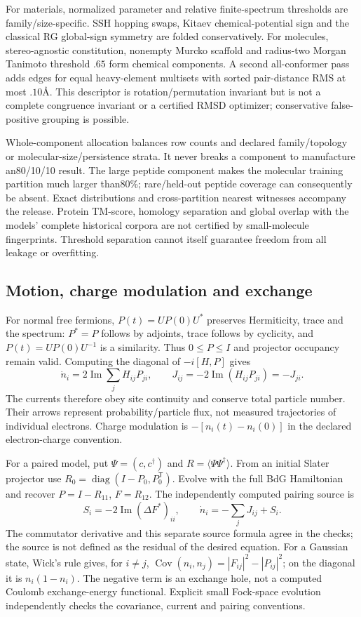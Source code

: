 \documentclass[11pt,oneside,openany]{book}
\theoremstyle{definition}\newtheorem{definition}[theorem]{Definition}
\theoremstyle{remark}\newtheorem{remark}[theorem]{Remark}
\begin{document}
For materials, normalized parameter and relative finite-spectrum thresholds
are family/size-specific. SSH hopping swaps, Kitaev chemical-potential sign
and the classical RG global-sign symmetry are folded conservatively. For
molecules, stereo-agnostic constitution, nonempty Murcko scaffold and
radius-two Morgan Tanimoto threshold $.65$ form chemical components. A second
all-conformer pass adds edges for equal heavy-element multisets with sorted
pair-distance RMS at most $.10$\AA. This descriptor is rotation/permutation
invariant but is not a complete congruence invariant or a certified RMSD
optimizer; conservative false-positive grouping is possible.

Whole-component allocation balances row counts and declared family/topology
or molecular-size/persistence strata. It never breaks a component to manufacture
an80/10/10 result. The large peptide component makes the molecular training
partition much larger than80\%; rare/held-out peptide coverage can consequently
be absent. Exact distributions and cross-partition nearest witnesses accompany
the release. Protein TM-score, homology separation and global overlap with the
models' complete historical corpora are not certified by small-molecule
fingerprints. Threshold separation cannot itself guarantee freedom from all
leakage or overfitting.

\subsection{Motion, charge modulation and exchange}
For normal free fermions, $P(t)=UP(0)U^*$ preserves Hermiticity, trace and the
spectrum: $P^*=P$ follows by adjoints, trace follows by cyclicity, and
$P(t)=U P(0)U^{-1}$ is a similarity. Thus $0\leq P\leq I$ and projector
occupancy remain valid. Computing the diagonal of $-i[H,P]$ gives
\[
 \dot n_i=2\operatorname{Im}\sum_jH_{ij}P_{ji},\qquad
 J_{ij}=-2\operatorname{Im}(H_{ij}P_{ji})=-J_{ji}.
\]
The currents therefore obey site continuity and conserve total particle number.
Their arrows represent probability/particle flux, not measured trajectories of
individual electrons. Charge modulation is $-[n_i(t)-n_i(0)]$ in the declared
electron-charge convention.

For a paired model, put $\Psi=(c,c^\dagger)$ and
$R=\langle\Psi\Psi^\dagger\rangle$. From an initial Slater projector use
$R_0=\operatorname{diag}(I-P_0,P_0^{\mathsf T})$. Evolve with the full BdG
Hamiltonian and recover $P=I-R_{11}$, $F=R_{12}$.
The independently computed pairing source is
\[
 S_i=-2\operatorname{Im}(\Delta F^*)_{ii},\qquad
 \dot n_i=-\sum_jJ_{ij}+S_i.
\]
The commutator derivative and this separate source formula agree in the
checks; the source is not defined as the residual of the desired equation.
For a Gaussian state, Wick's rule gives, for $i\ne j$,
$\operatorname{Cov}(n_i,n_j)=|F_{ij}|^2-|P_{ij}|^2$; on the diagonal it is
$n_i(1-n_i)$. The negative term is an exchange hole, not a computed Coulomb
exchange-energy functional. Explicit small Fock-space evolution independently
checks the covariance, current and pairing conventions.
\end{document}
